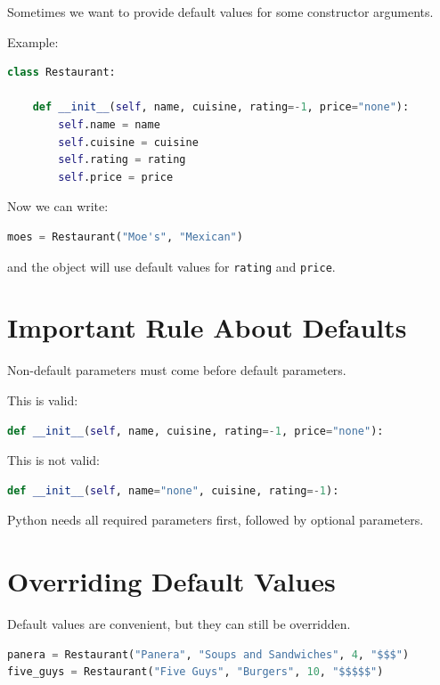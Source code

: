 \documentclass[11pt]{article}
\begin{document}
Sometimes we want to provide default values for some constructor arguments.

Example:

\begin{lstlisting}[language=Python]
class Restaurant:

    def __init__(self, name, cuisine, rating=-1, price="none"):
        self.name = name
        self.cuisine = cuisine
        self.rating = rating
        self.price = price
\end{lstlisting}

Now we can write:

\begin{lstlisting}[language=Python]
moes = Restaurant("Moe's", "Mexican")
\end{lstlisting}

and the object will use default values for \verb|rating| and \verb|price|.

\section{Important Rule About Defaults}

Non-default parameters must come before default parameters.

This is valid:

\begin{lstlisting}[language=Python]
def __init__(self, name, cuisine, rating=-1, price="none"):
\end{lstlisting}

This is not valid:

\begin{lstlisting}[language=Python]
def __init__(self, name="none", cuisine, rating=-1):
\end{lstlisting}

Python needs all required parameters first, followed by optional parameters.

\section{Overriding Default Values}

Default values are convenient, but they can still be overridden.

\begin{lstlisting}[language=Python]
panera = Restaurant("Panera", "Soups and Sandwiches", 4, "$$$")
five_guys = Restaurant("Five Guys", "Burgers", 10, "$$$$$")
\end{lstlisting}
\end{document}
